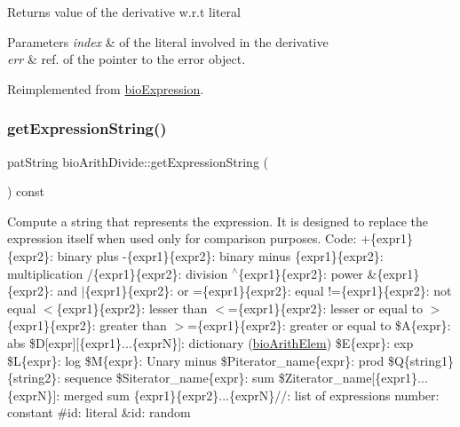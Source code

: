 \begin{DoxyReturn}{Returns}
value of the derivative w.\+r.\+t literal 
\end{DoxyReturn}

\begin{DoxyParams}{Parameters}
{\em index} & of the literal involved in the derivative \\
\hline
{\em err} & ref. of the pointer to the error object. \\
\hline
\end{DoxyParams}


Reimplemented from \hyperlink{classbio_expression_a5915579d1193f25f216c1e273c97f2ce}{bio\+Expression}.

\mbox{\label{classbio_arith_divide_a11ecaa69e3d86cb8598770f40ec03753}} 
\subsubsection{\texorpdfstring{get\+Expression\+String()}{getExpressionString()}}
{\footnotesize\ttfamily pat\+String bio\+Arith\+Divide\+::get\+Expression\+String (\begin{DoxyParamCaption}{ }\end{DoxyParamCaption}) const\hspace{0.3cm}{\ttfamily [virtual]}}

Compute a string that represents the expression. It is designed to replace the expression itself when used only for comparison purposes. Code\+: +\{expr1\}\{expr2\}\+: binary plus -\/\{expr1\}\{expr2\}\+: binary minus \{expr1\}\{expr2\}\+: multiplication /\{expr1\}\{expr2\}\+: division $^\wedge$\{expr1\}\{expr2\}\+: power \&\{expr1\}\{expr2\}\+: and $\vert$\{expr1\}\{expr2\}\+: or =\{expr1\}\{expr2\}\+: equal !=\{expr1\}\{expr2\}\+: not equal $<$\{expr1\}\{expr2\}\+: lesser than $<$=\{expr1\}\{expr2\}\+: lesser or equal to $>$\{expr1\}\{expr2\}\+: greater than $>$=\{expr1\}\{expr2\}\+: greater or equal to \$A\{expr\}\+: abs \$D\mbox{[}expr\mbox{]}\mbox{[}\{expr1\}...\{exprN\}\mbox{]}\+: dictionary (\hyperlink{classbio_arith_elem}{bio\+Arith\+Elem}) \$E\{expr\}\+: exp \$L\{expr\}\+: log \$M\{expr\}\+: Unary minus \$\+Piterator\+\_\+name\{expr\}\+: prod \$Q\{string1\}\{string2\}\+: sequence \$\+Siterator\+\_\+name\{expr\}\+: sum \$\+Ziterator\+\_\+name\mbox{[}\{expr1\}...\{exprN\}\mbox{]}\+: merged sum \{expr1\}\{expr2\}...\{exprN\}//\+: list of expressions number\+: constant \#id\+: literal \&id\+: random 

